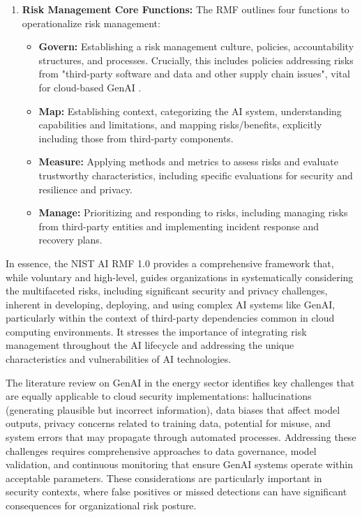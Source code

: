 \begin{enumerate}
    \item \textbf{Risk Management Core Functions:} The RMF outlines four functions to operationalize risk management:
    \begin{itemize}
      \item \textbf{Govern:} Establishing a risk management culture, policies, accountability structures, and processes. Crucially, this includes policies addressing risks from "third-party software and data and other supply chain issues", vital for cloud-based GenAI \cite[pp.21-24]{tabassi_artificial_2023}.
        \item \textbf{Map:} Establishing context, categorizing the AI system, understanding capabilities and limitations, and mapping risks/benefits, explicitly including those from third-party components\cite{tabassi_artificial_2023}.
        \item \textbf{Measure:} Applying methods and metrics to assess risks and evaluate trustworthy characteristics, including specific evaluations for security and resilience and privacy\cite{tabassi_artificial_2023}.
        \item \textbf{Manage:} Prioritizing and responding to risks, including managing risks from third-party entities and implementing incident response and recovery plans\cite{tabassi_artificial_2023}.
    \end{itemize}
\end{enumerate}

In essence, the NIST AI RMF 1.0 provides a comprehensive framework that, while voluntary and high-level, guides organizations in systematically considering the multifaceted risks, including significant security and privacy challenges, inherent in developing, deploying, and using complex AI systems like GenAI, particularly within the context of third-party dependencies common in cloud computing environments. It stresses the importance of integrating risk management throughout the AI lifecycle and addressing the unique characteristics and vulnerabilities of AI technologies.

The literature review on GenAI in the energy sector identifies key challenges that are equally applicable to cloud security implementations: hallucinations (generating plausible but incorrect information), data biases that affect model outputs, privacy concerns related to training data, potential for misuse, and system errors that may propagate through automated processes.
Addressing these challenges requires comprehensive approaches to data governance, model validation, and continuous monitoring that ensure GenAI systems operate within acceptable parameters. These considerations are particularly important in security contexts, where false positives or missed detections can have significant consequences for organizational risk posture.


